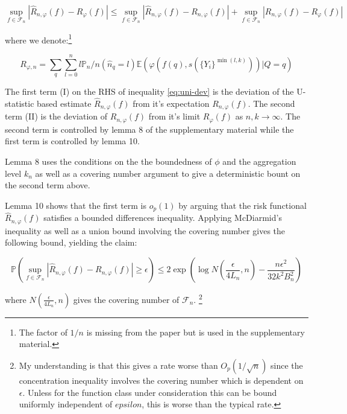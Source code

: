 \documentclass[a4paper,10pt]{article}
\begin{document}
\begin{equation} \label{eq:uni-dev}
  \sup_{f \in \mathcal{F}_n} \left| \hat{R}_{n, \varphi}(f) - R_\varphi(f) \right| \leq
  \sup_{f \in \mathcal{F}_n} \left| \hat{R}_{n, \varphi}(f) - R_{n, \varphi}(f) \right| +
  \sup_{f \in \mathcal{F}_n} \left| R_{n, \varphi}(f) - R_{\varphi}(f) \right|
\end{equation}

where we denote:\footnote{The factor of \(1/n\) is missing from the paper but is used in the supplementary material.}

\begin{equation}
  R_{\varphi, n} = \sum_q\sum_{l=0}^n l \mathbb{P}_n/n(\hat{n}_q = l) \mathbb{E}(\varphi(f(q), s(\{Y_i\}^{\min(l, k)}))|Q=q)
\end{equation}

The first term (I) on the RHS of inequality \ref{eq:uni-dev} is the deviation of the U-statistic based estimate \(\hat{R}_{n, \varphi}(f)\) from it's expectation \(R_{n, \varphi}(f)\). The second term (II) is the deviation of \(R_{n, \varphi}(f)\) from it's limit \(R_{\varphi}(f)\) as \(n, k \rightarrow \infty\). The second term is controlled by lemma 8 of the supplementary material \cite{duchi-2013-ranking} while the first term is controlled by lemma 10.

Lemma 8 uses the conditions on the the boundedness of \(\phi\) and the aggregation level \(k_n\) as well as a covering number argument to give a deterministic bount on the second term above.

Lemma 10 shows that the first term is \(o_p(1)\) by arguing that the risk functional \(\hat{R}_{n, \varphi}(f)\) satisfies a bounded differences inequality. Applying McDiarmid's inequality as well as a union bound involving the covering number gives the following bound, yielding the claim:

\begin{equation}
  \mathbb{P}\left( \sup_{f \in \mathcal{F}_n} \left| \hat{R}_{n, \varphi}(f) - R_{n, \varphi}(f) \right| \geq \epsilon \right) \leq 2\exp\left( \log N \left( \frac{\epsilon}{4L_n}, n \right) - \frac{n \epsilon^2}{32k^2B_n^2} \right)
\end{equation}

where \(N \left( \frac{\epsilon}{4L_n}, n \right)\) gives the covering number of \(\mathcal{F}_n\).
\footnote{My understanding is that this gives a rate worse than \(O_p(1/\sqrt n)\) since the concentration inequality involves the covering number which is dependent on \(\epsilon\). Unless for the function class under consideration this can be bound uniformly independent of \(epsilon\), this is worse than the typical rate.}
\end{document}
